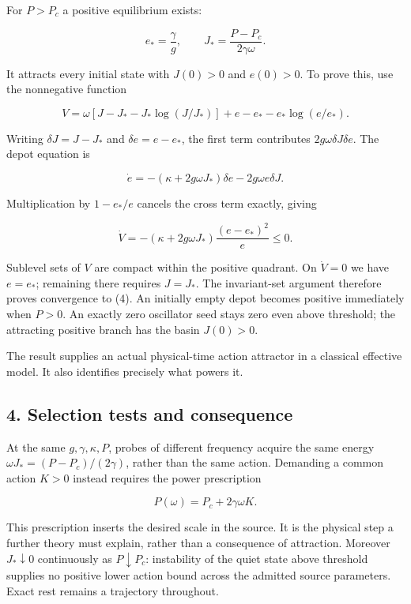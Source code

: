 \documentclass[11pt,a4paper]{article}
\begin{document}
For \(P>P_c\) a positive equilibrium exists:

\[e_* = \frac{\gamma}{g},\qquad
J_* = \frac{P-P_c}{2\gamma\omega}. \tag{4}\]

It attracts every initial state with \(J(0)>0\) and \(e(0)>0\). To prove
this, use the nonnegative function

\[V=\omega\left[J-J_*-J_*\log(J/J_*)\right]
 +e-e_*-e_*\log(e/e_*).\]

Writing \(\delta J=J-J_*\) and \(\delta e=e-e_*\), the first term
contributes \(2g\omega\delta J\delta e\). The depot equation is

\[\dot e=-(\kappa+2g\omega J_*)\delta e-2g\omega e\delta J.\]

Multiplication by \(1-e_*/e\) cancels the cross term exactly, giving

\[\dot V=-(\kappa+2g\omega J_*)\frac{(e-e_*)^2}{e}\le0. \tag{5}\]

Sublevel sets of \(V\) are compact within the positive quadrant. On
\(\dot V=0\) we have \(e=e_*\); remaining there requires \(J=J_*\). The
invariant-set argument therefore proves convergence to (4). An initially
empty depot becomes positive immediately when \(P>0\). An exactly zero
oscillator seed stays zero even above threshold; the attracting positive
branch has the basin \(J(0)>0\).

The result supplies an actual physical-time action attractor in a
classical effective model. It also identifies precisely what powers it.

\hypertarget{selection-tests-and-consequence}{%
\subsection{4. Selection tests and
consequence}\label{selection-tests-and-consequence}}

At the same \(g,\gamma,\kappa,P\), probes of different frequency acquire
the same energy \(\omega J_*=(P-P_c)/(2\gamma)\), rather than the same
action. Demanding a common action \(K>0\) instead requires the power
prescription

\[P(\omega)=P_c+2\gamma\omega K. \tag{6}\]

This prescription inserts the desired scale in the source. It is the
physical step a further theory must explain, rather than a consequence
of attraction. Moreover \(J_*\downarrow0\) continuously as
\(P\downarrow P_c\): instability of the quiet state above threshold
supplies no positive lower action bound across the admitted source
parameters. Exact rest remains a trajectory throughout.
\end{document}
